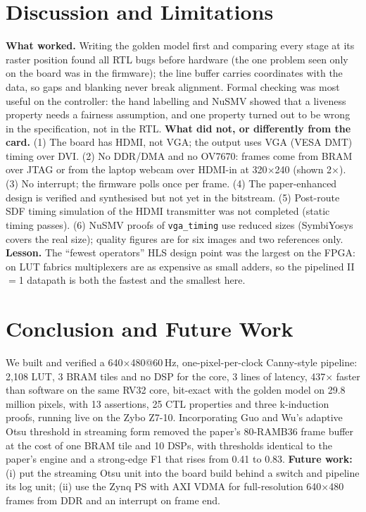 \documentclass[11pt,a4paper]{article}
\begin{document}
\section{Discussion and Limitations}
\label{sec:discussion}
\textbf{What worked.} Writing the golden model first and comparing every stage at its raster position found all RTL bugs before
hardware (the one problem seen only on the board was in the firmware); the line buffer carries coordinates with the data, so gaps and blanking never break alignment. Formal checking was most useful on
the controller: the hand labelling and NuSMV showed that a liveness property needs a fairness assumption, and one property
turned out to be wrong in the specification, not in the RTL. \textbf{What did not, or differently from the card.} (1) The board has HDMI, not VGA; the output uses VGA (VESA DMT)
timing over DVI. (2) No DDR/DMA and no OV7670: frames come from BRAM over JTAG or from the laptop webcam over HDMI-in at 320$\times$240
(shown 2$\times$). (3) No interrupt; the firmware polls once per frame. (4) The paper-enhanced design is verified and synthesised but not
yet in the bitstream. (5) Post-route SDF timing simulation of the HDMI transmitter was not completed (static timing passes). (6)
NuSMV proofs of \texttt{vga\_timing} use reduced sizes (SymbiYosys covers the real size); quality figures are for six images and two
references only. \textbf{Lesson.} The ``fewest operators'' HLS design point was the largest on the FPGA: on LUT fabrics
multiplexers are as expensive as small adders, so the pipelined II$=$1 datapath is both the fastest and the smallest here.

\section{Conclusion and Future Work}
\label{sec:conclusion}
We built and verified a 640$\times$480@60\,Hz, one-pixel-per-clock Canny-style pipeline: 2{,}108 LUT, 3 BRAM tiles and no DSP for the
core, 3 lines of latency, 437$\times$ faster than software on the same RV32 core, bit-exact with the golden model on 29.8 million
pixels, with 13 assertions, 25 CTL properties and three k-induction proofs, running live on the Zybo Z7-10. Incorporating Guo and Wu's
adaptive Otsu threshold in streaming form removed the paper's 80-RAMB36 frame buffer at the cost of one BRAM tile and 10 DSPs, with
thresholds identical to the paper's engine and a strong-edge F1 that rises from 0.41 to 0.83.
\textbf{Future work:} (i) put the streaming Otsu unit into the board build behind a switch and pipeline its log unit; (ii) use the
Zynq PS with AXI VDMA for full-resolution 640$\times$480 frames from DDR and an interrupt on frame end.
\end{document}
